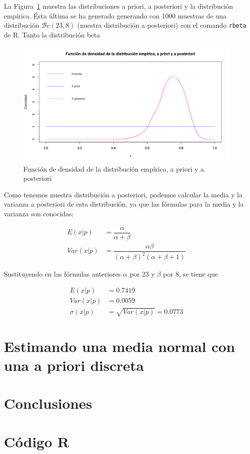 \documentclass[12pt,a4paper,twoside,openright,titlepage,final]{article}
\begin{document}
La Figura~\ref{fig:distribuciones_beta} muestra las distribuciones a priori, a posteriori y la distribución empírica. Ésta última se ha generado generando con 1000 muestras de una distribución $\mathcal{B}e(23,8)$ (nuestra distribución a posteriori) con el comando \texttt{rbeta} de R. Tanto la distribución beta 
\begin{figure}[tbph!]
\centering
\includegraphics[width=0.9\linewidth]{./imagenes/distribuciones_beta}
\caption{Función de densidad de la distribución empírica, a priori y a posteriori}
\label{fig:distribuciones_beta}
\end{figure}

Como tenemos nuestra distribución a posteriori, podemos calcular la media y la varianza a posteriori de esta distribución, ya que las fórmulas para la media y la varianza son conocidas:

\begin{align*}
E(x|p) & = \dfrac{\alpha}{\alpha + \beta}\\
Var(x|p) & = \dfrac{\alpha \beta}{(\alpha + \beta)^2 (\alpha + \beta + 1)}
\end{align*}

Sustituyendo en las fórmulas anteriores $\alpha$ por 23 y $\beta$ por 8, se tiene que

\begin{align*}
E(x|p) & = 0.7419 \\
Var(x|p) & = 0.0059 \\
\sigma(x|p) & = \sqrt{Var(x|p)} = 0.0773 
\end{align*}


\section{Estimando una media normal con una a priori discreta}

\section{Conclusiones}

\newpage

\section{Código R}

%
\end{document}
